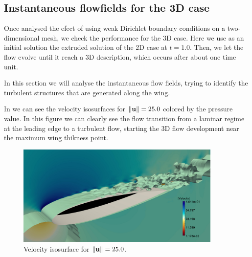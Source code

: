 \subsection{Instantaneous flowfields for the 3D case}
Once analysed the efect of using weak Dirichlet boundary conditions on a two-dimensional mesh, we check the performance for the 3D case. Here we use as an initial solution the extruded solution of the 2D case at $ t=1.0 $. Then, we let the flow evolve until it reach a 3D description, which occurs after about one time unit.

In this section we will analyse the instantaneous flow fields, trying to identify the turbulent structures that are generated along the wing.

In  we can see the velocity isosurfaces for $ \|{\bf u}\|=25.0 $ colored by the pressure value. In this figure we can clearly see the flow transition from a laminar regime at the leading edge to a turbulent flow, starting the 3D flow development near the maximum wing thikness point.
\begin{figure}[h!]
  \centering
  \includegraphics[width=0.9\textwidth]{Figures/Chapter8/weak/velo_3d}
  \caption{Velocity isosurface for $ \|{\bf u}\|=25.0  $.}
  \label{fig-NACA_3D_velo}
\end{figure}


